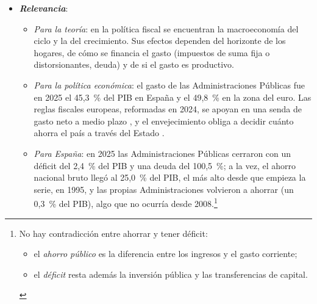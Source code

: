 \documentclass[11pt]{article}
\begin{document}
\begin{itemize}
\item \textbf{\emph{Relevancia}}:
  \begin{itemize}
  \item \emph{Para la teoría}: en la política fiscal se encuentran la macroeconomía del ciclo y la del crecimiento. Sus efectos dependen del horizonte de los hogares, de cómo se financia el gasto (impuestos de suma fija o distorsionantes, deuda) y de si el gasto es productivo.
  \item \emph{Para la política económica}: el gasto de las Administraciones Públicas fue en 2025 el 45,3~\% del PIB en España y el 49,8~\% en la zona del euro\nocite{Eurostat2026GovMain}. Las reglas fiscales europeas, reformadas en 2024, se apoyan en una senda de gasto neto a medio plazo\nocite{RegUE2024Preventivo} , y el envejecimiento obliga a decidir cuánto ahorra el país a través del Estado .
  \item \emph{Para España}: en 2025 las Administraciones Públicas cerraron con un déficit del 2,4~\% del PIB y una deuda del 100,5~\%\nocite{Eurostat2026EDP}; a la vez, el ahorro nacional bruto llegó al 25,0~\% del PIB, el más alto desde que empieza la serie, en 1995, y las propias Administraciones volvieron a ahorrar (un 0,3~\% del PIB), algo que no ocurría desde 2008\nocite{Eurostat2026nasa10nftr,Eurostat2026Nama10gdp}.\footnote{No hay contradicción entre ahorrar y tener déficit:
\begin{itemize}
\item el \emph{ahorro público} es la diferencia entre los ingresos y el gasto corriente;
\item el \emph{déficit} resta además la inversión pública y las transferencias de capital.
\end{itemize}}
  \end{itemize}


\end{itemize}
\end{document}
